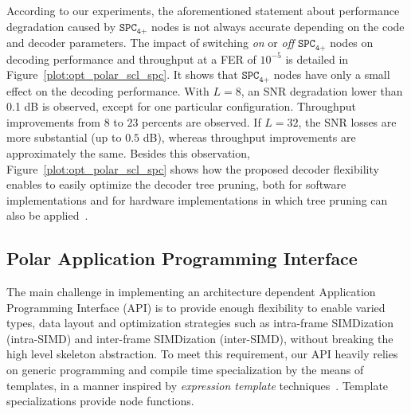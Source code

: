 According to our experiments, the aforementioned statement about performance
degradation caused by $\texttt{SPC}_\texttt{4+}$ nodes is not always accurate
depending on the code and decoder parameters. The impact of switching
\textit{on} or \textit{off} $\texttt{SPC}_\texttt{4+}$ nodes on decoding
performance and throughput at a FER of $10^{-5}$ is detailed in
Figure~\ref{plot:opt_polar_scl_spc}. It shows that $\texttt{SPC}_\texttt{4+}$
nodes have only a small effect on the decoding performance. With $L=8$, an SNR
degradation lower than 0.1 dB is observed, except for one particular
configuration. Throughput improvements from $8$ to $23$ percents are observed.
If $L=32$, the SNR losses are more substantial (up to $0.5$ dB), whereas
throughput improvements are approximately the same. Besides this observation,
Figure~\ref{plot:opt_polar_scl_spc} shows how the proposed decoder flexibility
enables to easily optimize the decoder tree pruning, both for software
implementations and for hardware implementations in which tree pruning can also
be applied~\cite{Lin2014}.

\subsection{Polar Application Programming Interface}
\label{sec:opt_polar_api}


The main challenge in implementing an architecture dependent Application
Programming Interface (API) is to provide enough flexibility to enable varied
types, data layout and optimization strategies such as intra-frame SIMDization
(intra-SIMD) and inter-frame SIMDization (inter-SIMD), without breaking the high
level skeleton abstraction. To meet this requirement, our API heavily relies on
generic programming and compile time specialization by the means of \Cxx
templates, in a manner inspired by \emph{expression template}
techniques~\cite{Stroustrup2013}. Template specializations provide node
functions.

